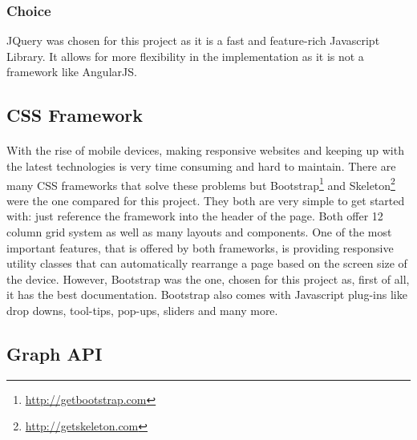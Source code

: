 \documentclass{l4proj}
\begin{document}
\subsubsection{Choice}
JQuery was chosen for this project as it is a fast and feature-rich Javascript Library. It allows for more flexibility in the implementation as it is not a framework like AngularJS. 

\subsection{CSS Framework}
\paragraph{}
With the rise of mobile devices, making responsive websites and keeping up with the latest technologies is very time consuming and hard to maintain. There are many CSS frameworks that solve these problems but Bootstrap\footnote{\url{http://getbootstrap.com}} and Skeleton\footnote{\url{http://getskeleton.com}} were the one compared for this project. They both are very simple to get started with: just reference the framework into the header of the page. Both offer 12 column grid system as well as many layouts and components. One of the most important features, that is offered by both frameworks, is providing responsive utility classes that can automatically rearrange a page based on the screen size of the device. However, Bootstrap was the one, chosen for this project as, first of all, it has the best documentation. Bootstrap also comes with Javascript plug-ins like drop downs, tool-tips, pop-ups, sliders and many more.   

\subsection{Graph API}
\end{document}
